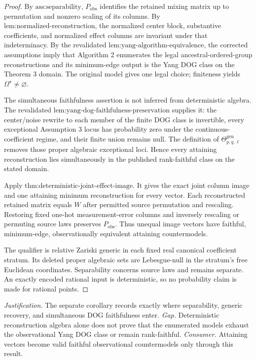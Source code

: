 \documentclass{article}
\begin{document}
\begin{proof}
By \(\text{ass:separability}\), \(P_{\mathrm{obs}}\) identifies the retained mixing matrix up to permutation and nonzero scaling of its columns. By \(\text{lem:normalized-reconstruction}\), the normalized center block, substantive coefficients, and normalized effect columns are invariant under that indeterminacy. By the revalidated \(\text{lem:yang-algorithm-equivalence}\), the corrected assumptions imply that Algorithm 2 enumerates the legal ancestral-ordered-group reconstructions and its minimum-edge output is the Yang DOG class on the Theorem 3 domain. The original model gives one legal choice; finiteness yields \(\Omega^\star\ne\varnothing\).

The simultaneous faithfulness assertion is not inferred from deterministic algebra. The revalidated \(\text{lem:yang-dog-faithfulness-preservation}\) supplies it: the center/noise rewrite to each member of the finite DOG class is invertible, every exceptional Assumption 3 locus has probability zero under the continuous-coefficient regime, and their finite union remains null. The definition of \(\Theta_{p,q,\ell}^{\mathrm{gen}}\) removes those proper algebraic exceptional loci. Hence every attaining reconstruction lies simultaneously in the published rank-faithful class on the stated domain.

Apply \(\text{thm:deterministic-joint-effect-image}\). It gives the exact joint column image and one attaining minimum reconstruction for every vector. Each reconstructed retained matrix equals \(W\) after permitted source permutation and rescaling. Restoring fixed one-hot measurement-error columns and inversely rescaling or permuting source laws preserves \(P_{\mathrm{obs}}\). Thus unequal image vectors have faithful, minimum-edge, observationally equivalent attaining countermodels.

The qualifier is relative Zariski generic in each fixed real canonical coefficient stratum. Its deleted proper algebraic sets are Lebesgue-null in the stratum's free Euclidean coordinates. Separability concerns source laws and remains separate. An exactly encoded rational input is deterministic, so no probability claim is made for rational points.
\end{proof}
\par\smallskip\noindent \textit{Justification.} The separate corollary records exactly where separability, generic recovery, and simultaneous DOG faithfulness enter. \textit{Gap.} Deterministic reconstruction algebra alone does not prove that the enumerated models exhaust the observational Yang DOG class or remain rank-faithful. \textit{Consumer.} Attaining vectors become valid faithful observational countermodels only through this result.
\end{document}
